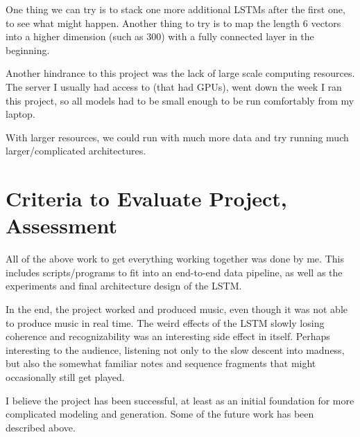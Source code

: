 \documentclass[12pt]{article}
\begin{document}
One thing we can try is to stack one more additional LSTMs after the first one, to see what might happen. Another thing to try is to map the length 6 vectors into a higher dimension (such as 300) with a fully connected layer in the beginning.

Another hindrance to this project was the lack of large scale computing resources. The server I usually had access to (that had GPUs), went down the week I ran this project, so all models had to be small enough to be run comfortably from my laptop.

With larger resources, we could run with much more data and try running much larger/complicated architectures. 

\section{Criteria to Evaluate Project, Assessment}
All of the above work to get everything working together was done by me.
This includes scripts/programs to fit into an end-to-end data pipeline, as well as the experiments and final architecture design of the LSTM.

In the end, the project worked and produced music, even though it was not able to produce music in real time.
The weird effects of the LSTM slowly losing coherence and recognizability was an interesting side effect in itself. Perhaps interesting to the audience, listening not only to the slow descent into madness, but also the somewhat familiar notes and sequence fragments that might occasionally still get played.

I believe the project has been successful, at least as an initial foundation for more complicated modeling and generation. Some of the future work has been described above.
\end{document}
